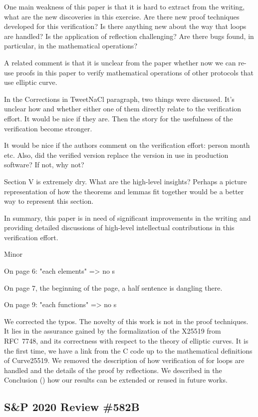 One main weakness of this paper is that it is hard to extract from the writing,
what are the new discoveries in this exercise. Are there new proof techniques
developed for this verification? Is there anything new about the way that loops
are handled? Is the application of reflection challenging? Are there bugs found,
in particular, in the mathematical operations?

A related comment is that it is unclear from the paper whether now we can re-use
proofs in this paper to verify  mathematical operations of other protocols that
use elliptic curve.

In the Corrections in TweetNaCl paragraph, two things were discussed. It's
unclear how and whether either one of them directly relate to the verification
effort. It would be nice if they are. Then the story for the usefulness of the
verification become stronger.

It would be nice if the authors comment on the verification effort: person month
etc. Also, did the verified version replace the version in use in production
software? If not, why not?

Section V is extremely dry. What are the high-level insights? Perhaps a picture
representation of how the theorems and lemmas fit together would be a better way
to represent this section.

In summary, this paper is in need of significant improvements in the writing and
providing detailed discussions of high-level intellectual contributions in this
verification effort.

Minor

On page 6: "each elements" => no s

On page 7, the beginning of the page, a half sentence is
dangling there.

On page 9: "each functions" => no s


We corrected the typos.
The novelty of this work is not in the proof techniques.
It lies in the assurance gained by the formalization of the X25519 from RFC~7748,
and its correctness with respect to the theory of elliptic curves.
It is the first time, we have a link from the C code up to the mathematical
definitions of Curve25519.
We removed the description of how verification of for loops are handled and the
details of the proof by reflections.
We described in the Conclusion () how our results can be
extended or reused in future works.


\subsection{S\&P 2020 Review \#582B}

